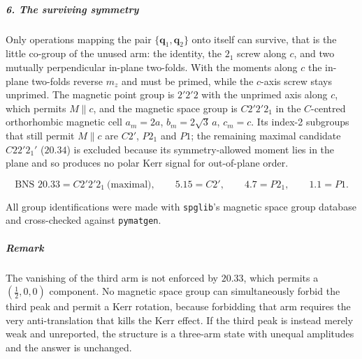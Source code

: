 \subparagraph*{6. The surviving symmetry}

Only operations mapping the pair $\{\mathbf{q}_1,\mathbf{q}_2\}$ onto itself can survive, that is the little co-group of the unused arm: the identity, the $2_1$ screw along $c$, and two mutually perpendicular in-plane two-folds. With the moments along $c$ the in-plane two-folds reverse $m_z$ and must be primed, while the $c$-axis screw stays unprimed. The magnetic point group is $2'2'2$ with the unprimed axis along $c$, which permits $M\parallel c$, and the magnetic space group is $C2'2'2_1$ in the $C$-centred orthorhombic magnetic cell $a_m=2a$, $b_m=2\sqrt{3}\,a$, $c_m=c$. Its index-2 subgroups that still permit $M\parallel c$ are $C2'$, $P2_1$ and $P1$; the remaining maximal candidate $C22'2_1'$ ($20.34$) is excluded because its symmetry-allowed moment lies in the plane and so produces no polar Kerr signal for out-of-plane order.

\[
{ \text{BNS } 20.33=C2'2'2_1\ \text{(maximal)},\qquad 5.15=C2',\qquad 4.7=P2_1,\qquad 1.1=P1. }
\]

All group identifications were made with \texttt{spglib}'s magnetic space group database and cross-checked against \texttt{pymatgen}.

\subparagraph*{Remark}

The vanishing of the third arm is not enforced by $20.33$, which permits a $(\tfrac12,0,0)$ component. No magnetic space group can simultaneously forbid the third peak and permit a Kerr rotation, because forbidding that arm requires the very anti-translation that kills the Kerr effect. If the third peak is instead merely weak and unreported, the structure is a three-arm state with unequal amplitudes and the answer is unchanged.

